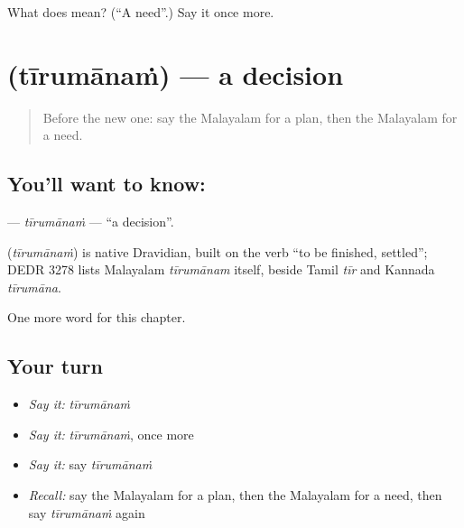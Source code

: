\begin{tcolorbox}[breakable,colback=teal!4,colframe=teal!35!black,title={Before you move on}]
What does  mean? (\textquotedblleft{}A need\textquotedblright{}.) Say it once more.
\end{tcolorbox}
\section[\texorpdfstring{\ml{തീരുമാനം} (tīrumānaṁ)}{തീരുമാനം (tīrumānaṁ)}]{ (tīrumānaṁ) — a decision}

\label{lesson:ML-C146-tirumanam}



\begin{quote}
Before the new one: say the Malayalam for a plan, then the Malayalam for a need.
\end{quote}

\subsection*{You'll want to know: }
\textbf{} — \emph{tīrumānaṁ} — \textquotedblleft{}a decision\textquotedblright{}.

\begin{cousinweb}
\textbf{} (\emph{tīrumānaṁ}) is native Dravidian, built on the verb \textquotedblleft{}to be finished, settled\textquotedblright{}; DEDR 3278 lists Malayalam \emph{tīrumānam} itself, beside Tamil \emph{tīr} and Kannada \emph{tīrumāna}.
\end{cousinweb}

\begin{grammarlens}[title={What you've built}]
One more word for this chapter.
\end{grammarlens}

\subsection*{Your turn}
\begin{itemize}
\raggedright
  \item \emph{Say it:} \emph{tīrumānaṁ}
  \item \emph{Say it:} \emph{tīrumānaṁ}, once more
  \item \emph{Say it:} say \emph{tīrumānaṁ}
  \item \emph{Recall:} say the Malayalam for a plan, then the Malayalam for a need, then say \emph{tīrumānaṁ} again
\end{itemize}

